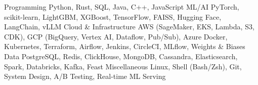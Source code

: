 

\begin{cvskills}
  \cvskill
    {Programming} %
    {Python, Rust, SQL, Java, C++, JavaScript}
  \cvskill
    {ML/AI} %
    {PyTorch, scikit-learn, LightGBM, XGBoost, TensorFlow, FAISS, Hugging Face, LangChain, vLLM}
  \cvskill
    {Cloud \& Infrastructure} %
    {AWS (SageMaker, EKS, Lambda, S3, CDK), GCP (BigQuery, Vertex AI, Dataflow, Pub/Sub), Azure}
  \cvskill
    {} %
    {Docker, Kubernetes, Terraform, Airflow, Jenkins, CircleCI, MLflow, Weights \& Biases}
  \cvskill
    {Data} %
    {PostgreSQL, Redis, ClickHouse, MongoDB, Cassandra, Elasticsearch, Spark, Databricks, Kafka, Feast}
  \cvskill
    {Miscellaneous} %
    {Linux, Shell (Bash/Zsh), Git, System Design, A/B Testing, Real-time ML Serving}
\end{cvskills}
